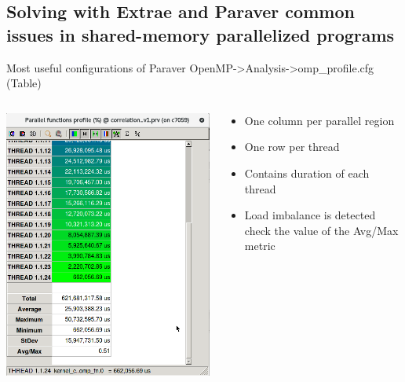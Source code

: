 \documentclass[10pt,xcolor=table]{beamer}
\begin{document}
\subsection{Solving with Extrae and Paraver common issues in shared-memory parallelized programs}

\begin{frame}{Most useful configurations of Paraver}
\centering
OpenMP->Analysis->omp\_profile.cfg (Table)

\begin{columns}
\begin{column}{0.5\textwidth}
\includegraphics[width=\textwidth]{figs/omp_profile_table.png}
\end{column}
\begin{column}{0.5\textwidth}
  \begin{itemize}
      \item One column per parallel region
      \item One row per thread
      \item Contains duration of each thread
      \item Load imbalance is detected check the value of the Avg/Max metric
  \end{itemize}
\end{column}
\end{columns}
\end{frame}
\end{document}
